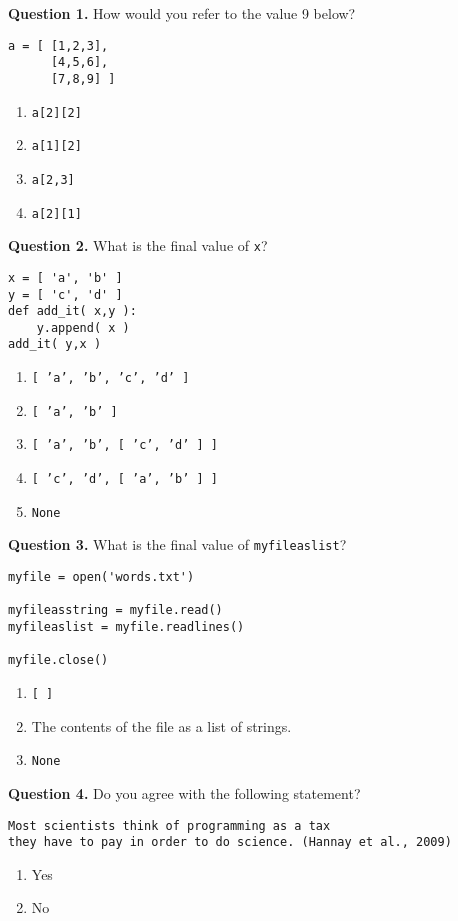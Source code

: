 \documentclass[12pt]{article}
\begin{document}


{\bf Question 1.}    How would you refer to the value 9 below?
\begin{lstlisting}[frame=single]
a = [ [1,2,3],
      [4,5,6],
      [7,8,9] ]
\end{lstlisting}
\vspace{-0.5cm}
  \begin{enumerate}[label=\Alph*]
   \item  \texttt{a[2][2]} %
   \item  \texttt{a[1][2]}
   \item  \texttt{a[2,3]}
   \item  \texttt{a[2][1]}  
  \end{enumerate}

{\bf Question 2.}     What is the final value of \texttt{x}?
\begin{lstlisting}[frame=single]
x = [ 'a', 'b' ]
y = [ 'c', 'd' ]
def add_it( x,y ):
    y.append( x )
add_it( y,x )
\end{lstlisting}
\vspace{-0.5cm}
\begin{enumerate}[label=\Alph*]
  \item  \texttt{[ 'a', 'b', 'c', 'd' ]}
  \item  \texttt{[ 'a', 'b' ]}
  \item  \texttt{[ 'a', 'b', [ 'c', 'd' ] ]} %
  \item  \texttt{[ 'c', 'd', [ 'a', 'b' ] ]}
  \item  \texttt{None}
\end{enumerate}

{\bf Question 3.}  What is the final value of \texttt{myfileaslist}?
\begin{lstlisting}[frame=single]
myfile = open('words.txt')

myfileasstring = myfile.read()
myfileaslist = myfile.readlines()

myfile.close()
\end{lstlisting}
\vspace{-0.5cm}
\begin{enumerate}[label=\Alph*]
	 \item  \texttt{[ ]} %
	 \item  The contents of the file as a list of strings.
	 \item  \texttt{None}
\end{enumerate}

{\bf Question 4.}   Do you agree with the following statement?
\begin{lstlisting}[frame=single]
Most scientists think of programming as a tax 
they have to pay in order to do science. (Hannay et al., 2009)
\end{lstlisting}
\vspace{-0.5cm}
\begin{enumerate}[label=\Alph*]
  \item  Yes
  \item  No
\end{enumerate}
\end{document}
